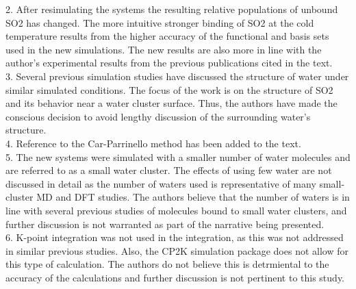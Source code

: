 \documentclass{article}
\begin{document}
2. After resimulating the systems the resulting relative populations of unbound SO2 has changed. The more intuitive stronger binding of SO2 at the cold temperature results from the higher accuracy of the functional and basis sets used in the new simulations. The new results are also more in line with the author's experimental results from the previous publications cited in the text.
\\

3. Several previous simulation studies have discussed the structure of water under similar simulated conditions. The focus of the work is on the structure of SO2 and its behavior near a water cluster surface. Thus, the authors have made the conscious decision to avoid lengthy discussion of the surrounding water's structure.
\\

4. Reference to the Car-Parrinello method has been added to the text.
\\

5. The new systems were simulated with a smaller number of water molecules and are referred to as a small water cluster. The effects of using few water are not discussed in detail as the number of waters used is representative of many small-cluster MD and DFT studies. The authors believe that the number of waters is in line with several previous studies of molecules bound to small water clusters, and further discussion is not warranted as part of the narrative being presented.
\\

6. K-point integration was not used in the integration, as this was not addressed in similar previous studies. Also, the CP2K simulation package does not allow for this type of calculation. The authors do not believe this is detrmiental to the accuracy of the calculations and further discussion is not pertinent to this study.
\\
\end{document}
